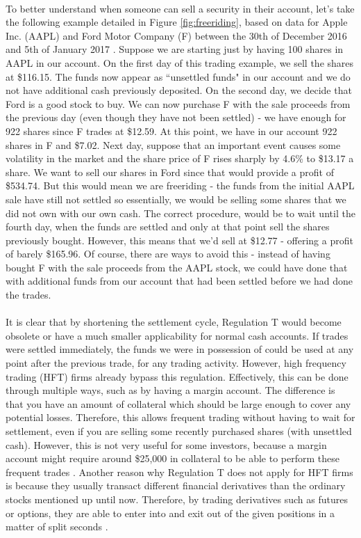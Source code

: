 \documentclass[12pt,twoside]{article}
\begin{document}
\\
To better understand when someone can sell a security in their account, let's take the following example detailed in Figure \ref{fig:freeriding}, based on data for Apple Inc. (AAPL) and Ford Motor Company (F) between the 30th of December 2016 and 5th of January 2017 \cite{yahoo}. Suppose we are starting just by having 100 shares in AAPL in our account. On the first day of this trading example, we sell the shares at \$116.15. The funds now appear as ``unsettled funds" in our account and we do not have additional cash previously deposited. On the second day, we decide that Ford is a good stock to buy. We can now purchase F with the sale proceeds from the previous day (even though they have not been settled) - we have enough for 922 shares since F trades at \$12.59. At this point, we have in our account 922 shares in F and \$7.02. Next day, suppose that an important event causes some volatility in the market and the share price of F rises sharply by 4.6\% to \$13.17 a share. We want to sell our shares in Ford since that would provide a profit of \$534.74. But this would mean we are freeriding - the funds from the initial AAPL sale have still not settled so essentially, we would be selling some shares that we did not own with our own cash. The correct procedure, would be to wait until the fourth day, when the funds are settled and only at that point sell the shares previously bought. However, this means that we'd sell at \$12.77 - offering a profit of barely \$165.96. Of course, there are ways to avoid this - instead of having bought F with the sale proceeds from the AAPL stock, we could have done that with additional funds from our account that had been settled before we had done the trades.
\\ \\
It is clear that by shortening the settlement cycle, Regulation T would become obsolete or have a much smaller applicability for normal cash accounts. If trades were settled immediately, the funds we were in possession of could be used at any point after the previous trade, for any trading activity. However, high frequency trading (HFT) firms already bypass this regulation. Effectively, this can be done through multiple ways, such as by having a margin account. The difference is that you have an amount of collateral which should be large enough to cover any potential losses. Therefore, this allows frequent trading without having to wait for settlement, even if you are selling some recently purchased shares (with unsettled cash). However, this is not very useful for some investors, because a margin account might require around \$25,000 in collateral to be able to perform these frequent trades \cite{marginACCT}. Another reason why Regulation T does not apply for HFT firms is because they usually transact different financial derivatives than the ordinary stocks mentioned up until now. Therefore, by trading derivatives such as futures or options, they are able to enter into and exit out of the given positions in a matter of split seconds \cite{marginEXP}. 
\end{document}
